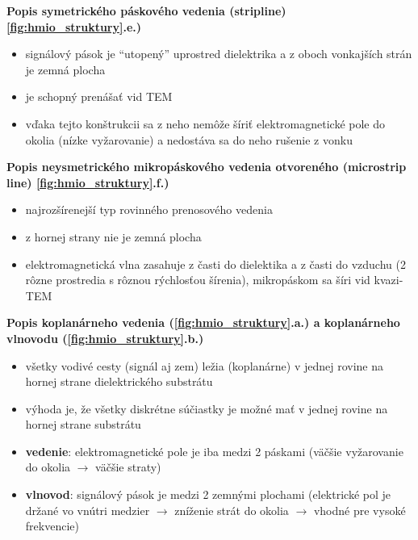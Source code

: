 	\bigskip
	\textbf{Popis symetrického páskového vedenia (stripline) \ref{fig:hmio_struktury}.e.)}
	\begin{itemize}[label=$\rightarrow$]
		\item signálový pások je ``utopený'' uprostred dielektrika a z oboch vonkajších strán je zemná plocha
		\item je schopný prenášať vid TEM
		\item vďaka tejto konštrukcii sa z neho nemôže šíriť elektromagnetické pole do okolia (nízke vyžarovanie) a nedostáva sa do neho rušenie z vonku
	\end{itemize}
	
	\textbf{Popis neysmetrického mikropáskového vedenia otvoreného (microstrip line) \ref{fig:hmio_struktury}.f.)}
	\begin{itemize}[label=$\rightarrow$]
	\item najrozšírenejší typ rovinného prenosového vedenia
	\item z hornej strany nie je zemná plocha
	\item elektromagnetická vlna zasahuje z časti do dielektika a z časti do vzduchu (2 rôzne prostredia s  rôznou rýchlosťou šírenia), mikropáskom sa šíri vid kvazi-TEM
	\end{itemize}
	
	\textbf{Popis koplanárneho vedenia (\ref{fig:hmio_struktury}.a.) a koplanárneho vlnovodu (\ref{fig:hmio_struktury}.b.)}
	\begin{itemize}[label=$\rightarrow$]
		\item všetky vodivé cesty (signál aj zem) ležia (koplanárne) v jednej rovine na hornej strane dielektrického substrátu
		\item výhoda je, že všetky diskrétne súčiastky je možné mať v jednej rovine na hornej strane substrátu
		\item \textbf{vedenie}: elektromagnetické pole je iba medzi 2 páskami (väčšie vyžarovanie do okolia $\rightarrow$ väčšie straty)
		\item \textbf{vlnovod}: signálový pások je medzi 2 zemnými plochami (elektrické pol je držané vo vnútri medzier $\rightarrow$ zníženie strát do okolia $\rightarrow$ vhodné pre vysoké frekvencie)
	\end{itemize}

